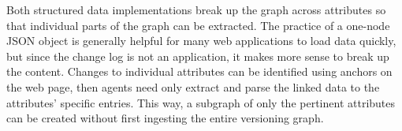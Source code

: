 Both structured data implementations break up the graph across attributes so that individual parts of the graph can be extracted.
The practice of a one-node JSON object is generally helpful for many web applications to load data quickly, but since the change log is not an application, it makes more sense to break up the content.
Changes to individual attributes can be identified using anchors on the web page, then agents need only extract and parse the linked data to the attributes' specific entries.
This way, a subgraph of only the pertinent attributes can be created without first ingesting the entire versioning graph.